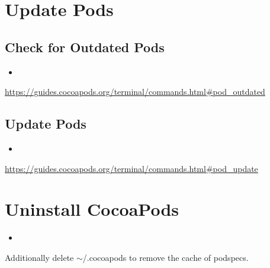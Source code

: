 \documentclass[a4paper, twocolumn]{article}
\newcommand{\insertshellcode}[2]{\begin{itemize}\item[]\end{itemize}} %
\begin{document}
\section{Update Pods}
\subsection{Check for Outdated Pods}
\insertshellcode{"Scripts/outdatedPods.txt"}{} %
\url{https://guides.cocoapods.org/terminal/commands.html#pod_outdated}
\subsection{Update Pods}
\insertshellcode{"Scripts/updatePods.txt"}{} %
\url{https://guides.cocoapods.org/terminal/commands.html#pod_update}

\section{Uninstall CocoaPods}
\insertshellcode{"Scripts/uninstallCocoaPods.txt"}{} %
Additionally delete $\sim$/.cocoapods to remove the cache of podspecs.
\end{document}
